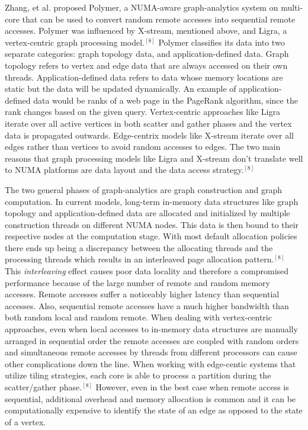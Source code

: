\documentclass[conference]{IEEEtran}
\begin{document}
Zhang, et al. proposed Polymer, a NUMA-aware graph-analytics system on multi-core that can be used to convert random remote accesses into sequential remote accesses.  Polymer was influenced by X-stream, mentioned above, and Ligra, a vertex-centric graph processing model.$^{[8]}$  Polymer classifies its data into two separate categories: graph topology data, and application-defined data.  Graph topology refers to vertex and edge data that are always accessed on their own threads.  Application-defined data refers to data whose memory locations are static but the data will be updated dynamically.  An example of application-defined data would be ranks of a web page in the PageRank algorithm, since the rank changes based on the given query.  Vertex-centric approaches like Ligra iterate over all active vertices in both scatter and gather phases and the vertex data is propagated outwards.  Edge-centrix models like X-stream iterate over all edges rather than vertices to avoid random accesses to edges.  The two main reasons that graph processing models like Ligra and X-stream don't translate well to NUMA platforms are data layout and the data access strategy.$^{[8]}$  

The two general phases of graph-analytics are graph construction and graph computation.  In current models, long-term in-memory data structures like graph topology and application-defined data are allocated and initialized by multiple construction threads on different NUMA nodes.  This data is then bound to their respective nodes at the computation stage.  With most default allocation policies there ends up being a discrepancy between the allocating threads and the processing threads which results in an interleaved page allocation pattern.$^{[8]}$  This \textit{interleaving} effect causes poor data locality and therefore a compromised performance because of the large number of remote and random memory accesses.  Remote accesses suffer a noticeably higher latency than sequential accesses.  Also, sequential remote accesses have a much higher bandwidth than both random local and random remote.  When dealing with vertex-centric approaches, even when local accesses to in-memory data structures are manually arranged in sequential order the remote accesses are coupled with random orders and simultaneous remote accesses by threads from different processors can cause other complications down the line.  When working with edge-centic systems that utilize tiling strategies, each core is able to process a partition during the scatter/gather phase.$^{[8]}$  However, even in the best case when remote access is sequential, additional overhead and memory allocation is common and it can be computationally expensive to identify the state of an edge as opposed to the state of a vertex.  
\end{document}
